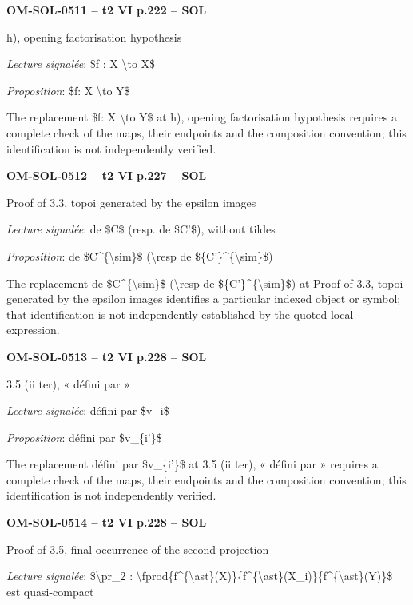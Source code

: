 \par\noindent\textbf{OM-SOL-0511 -- t2 VI p.222 -- SOL}\par
h), opening factorisation hypothesis\par
\emph{Lecture signalée}: \$f : X \textbackslash{}to X\$\par
\emph{Proposition}: \$f: X \textbackslash{}to Y\$\par
The replacement \$f: X \textbackslash{}to Y\$ at h), opening factorisation hypothesis requires a complete check of the maps, their endpoints and the composition convention; this identification is not independently verified.\par
\par\noindent\textbf{OM-SOL-0512 -- t2 VI p.227 -- SOL}\par
Proof of 3.3, topoi generated by the epsilon images\par
\emph{Lecture signalée}: de \$C\$ (resp. de \$C'\$), without tildes\par
\emph{Proposition}: de \$C\textasciicircum{}\{\textbackslash{}sim\}\$ (\textbackslash{}resp de \$\{C'\}\textasciicircum{}\{\textbackslash{}sim\}\$)\par
The replacement de \$C\textasciicircum{}\{\textbackslash{}sim\}\$ (\textbackslash{}resp de \$\{C'\}\textasciicircum{}\{\textbackslash{}sim\}\$) at Proof of 3.3, topoi generated by the epsilon images identifies a particular indexed object or symbol; that identification is not independently established by the quoted local expression.\par
\par\noindent\textbf{OM-SOL-0513 -- t2 VI p.228 -- SOL}\par
3.5 (ii ter), « défini par »\par
\emph{Lecture signalée}: défini par \$v\_i\$\par
\emph{Proposition}: défini par \$v\_\{i'\}\$\par
The replacement défini par \$v\_\{i'\}\$ at 3.5 (ii ter), « défini par » requires a complete check of the maps, their endpoints and the composition convention; this identification is not independently verified.\par
\par\noindent\textbf{OM-SOL-0514 -- t2 VI p.228 -- SOL}\par
Proof of 3.5, final occurrence of the second projection\par
\emph{Lecture signalée}: \$\textbackslash{}pr\_2 : \textbackslash{}fprod\{f\textasciicircum{}\{\textbackslash{}ast\}(X)\}\{f\textasciicircum{}\{\textbackslash{}ast\}(X\_i)\}\{f\textasciicircum{}\{\textbackslash{}ast\}(Y)\}\$ est quasi-compact\par
